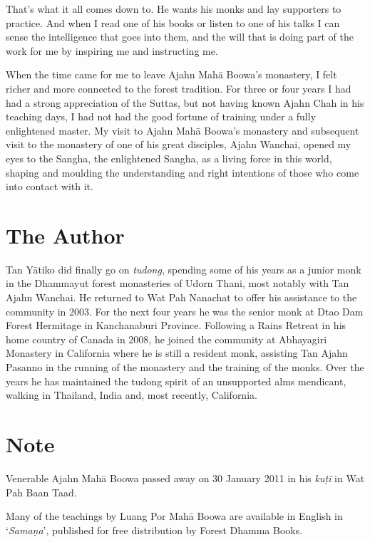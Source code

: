 That's what it all comes down to. He wants his monks and lay supporters
to practice. And when I read one of his books or listen to one of his
talks I can sense the intelligence that goes into them, and the will
that is doing part of the work for me by inspiring me and instructing
me. 

When the time came for me to leave Ajahn Mahā Boowa's monastery, I felt
richer and more connected to the forest tradition. For three or four
years I had had a strong appreciation of the Suttas, but not having
known Ajahn Chah in his teaching days, I had not had the good fortune of
training under a fully enlightened master. My visit to Ajahn Mahā
Boowa's monastery and subsequent visit to the monastery of one of his
great disciples, Ajahn Wanchai, opened my eyes to the Sangha, the
enlightened Sangha, as a living force in this world, shaping and
moulding the understanding and right intentions of those who come into
contact with it. 

\clearpage

\section{The Author}

Tan Yātiko did finally go on \emph{tudong}, spending some of his years as
a junior monk in the Dhammayut forest
monasteries of Udorn Thani, most notably with Tan Ajahn Wanchai. He
returned to Wat Pah Nanachat to offer his assistance to the community in
2003. For the next four years he was the senior monk at Dtao Dam Forest
Hermitage in Kanchanaburi Province. Following a Rains Retreat in his
home country of Canada in 2008, he joined the community at Abhayagiri
Monastery in California where he is still a resident monk, assisting Tan
Ajahn Pasanno in the running of the monastery and the training of the
monks. Over the years he has maintained the tudong spirit of an
unsupported alms mendicant, walking in Thailand, India and, most
recently, California.

\section{Note}

Venerable Ajahn Mahā Boowa passed away on 30 January 2011 in his
\emph{kuṭī} in Wat Pah Baan Taad.

Many of the teachings by Luang Por Mahā Boowa are available in English
in `\emph{Samaṇa}', published for free distribution by Forest Dhamma
Books.


